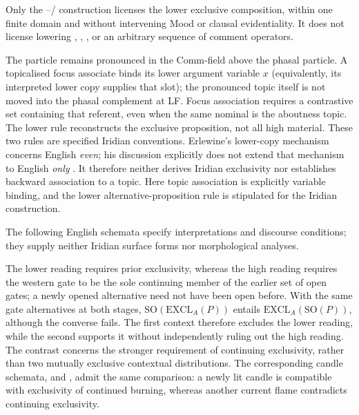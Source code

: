 Only the --/ construction licenses the
lower exclusive composition, within one finite domain and without intervening Mood or
clausal evidentiality. It does not license lowering , ,
, or an arbitrary sequence of comment operators.

The particle remains pronounced in the Comm-field above the phasal particle.
A topicalised focus associate binds its lower argument
variable $x$ (equivalently, its interpreted lower copy supplies that slot);
the pronounced topic itself is not moved into the phasal complement at LF.
Focus association requires a contrastive set containing that referent, even
when the same nominal is the aboutness topic. The lower rule reconstructs the
exclusive proposition, not all high material. These two rules are specified
Iridian conventions. Erlewine's lower-copy mechanism concerns English
\textit{even}; his discussion explicitly does not extend that mechanism to
English \textit{only} \cite[p.~863, fn.~9]{erlewine2016copies}. It therefore
neither derives Iridian exclusivity nor establishes backward association to a
topic. Here topic association is explicitly variable binding, and the lower
alternative-proposition rule is stipulated for the Iridian construction.

The following English schemata specify interpretations and discourse
conditions; they supply neither Iridian surface forms nor morphological
analyses.

\pex
\a {}
\a {}
\xe

The lower reading requires prior exclusivity, whereas the high reading
requires the western gate to be the sole continuing member of the earlier
set of open gates; a newly opened alternative need not have been open before.
With the same gate alternatives at both stages,
$\mathrm{SO}(\mathrm{EXCL}_{A}(P))$ entails
$\mathrm{EXCL}_{A}(\mathrm{SO}(P))$, although the converse fails. The
first context therefore excludes the lower reading, while the second supports
it without independently ruling out the high reading. The contrast concerns
the stronger requirement of continuing exclusivity, rather than two
mutually exclusive contextual distributions. The corresponding candle
schemata,  and
, admit the same
comparison: a newly lit candle is compatible with exclusivity of continued
burning, whereas another current flame contradicts continuing exclusivity.


